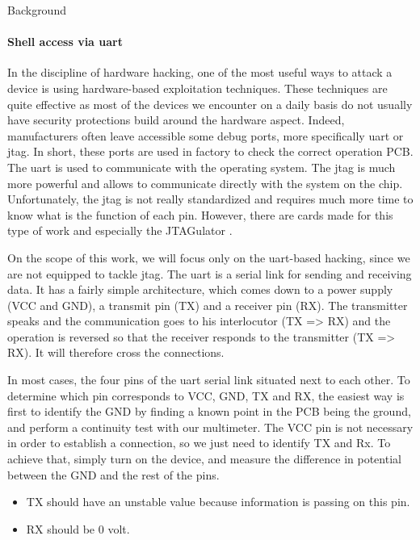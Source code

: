 \begin{chaptercover}{Background}
\paragraph{Shell access via \acrshort{uart}}\label{subsec:uart-jtag} In the discipline of hardware hacking, one of the most useful ways to attack a device is using hardware-based exploitation techniques. These techniques are quite effective as most of the devices we encounter on a daily basis do not usually have security protections build around the hardware aspect. Indeed, manufacturers often leave accessible some debug ports, more specifically \acrfull{uart} or \acrfull{jtag}. In short, these ports are used in factory to check the correct operation PCB. The \acrshort{uart} is used to communicate with the operating system. The \acrshort{jtag} is much more powerful and allows to communicate directly with the system on the chip. Unfortunately, the \acrshort{jtag} is not really standardized and requires much more time to know what is the function of each pin. However, there are cards made for this type of work and especially the JTAGulator \cite{jtagulator}.

\begin{indentbox}{1cm}
On the scope of this work, we will focus only on the \acrshort{uart}-based hacking, since we are not equipped to tackle \acrshort{jtag}. The \acrshort{uart} is a serial link for sending and receiving data. It has a fairly simple architecture, which comes down to a power supply (VCC and GND), a transmit pin (TX) and a receiver pin (RX). The transmitter speaks and the communication goes to his interlocutor (TX => RX) and the operation is reversed so that the receiver responds to the transmitter (TX => RX). It will therefore cross the connections.

In most cases, the four pins of the \acrshort{uart} serial link situated next to each other. To determine which pin corresponds to VCC, GND, TX and RX, the easiest way is first to identify the GND by finding a known point in the PCB being the ground, and perform a continuity test with our multimeter. The VCC pin is not necessary in order to establish a connection, so we just need to identify TX and Rx. To achieve that, simply turn on the device, and measure the difference in potential between the GND and the rest of the pins.
\begin{itemize}[itemsep=0.1cm,topsep=0.1cm]
  \item TX should have an unstable value because information is passing on this pin.
  \item RX should be 0 volt.
\end{itemize}
\end{indentbox}


\end{chaptercover}
